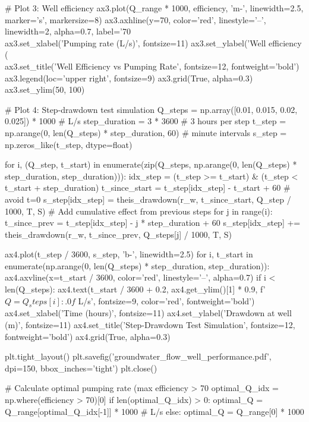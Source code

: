 \documentclass[a4paper, 11pt]{article}
\begin{document}
\begin{pycode}
# Plot 3: Well efficiency
ax3.plot(Q_range * 1000, efficiency, 'm-', linewidth=2.5, marker='s', markersize=8)
ax3.axhline(y=70, color='red', linestyle='--', linewidth=2, alpha=0.7, label='70\\%
ax3.set_xlabel('Pumping rate (L/s)', fontsize=11)
ax3.set_ylabel('Well efficiency (\\%
ax3.set_title('Well Efficiency vs Pumping Rate', fontsize=12, fontweight='bold')
ax3.legend(loc='upper right', fontsize=9)
ax3.grid(True, alpha=0.3)
ax3.set_ylim(50, 100)

# Plot 4: Step-drawdown test simulation
Q_steps = np.array([0.01, 0.015, 0.02, 0.025]) * 1000  # L/s
step_duration = 3 * 3600  # 3 hours per step
t_step = np.arange(0, len(Q_steps) * step_duration, 60)  # minute intervals
s_step = np.zeros_like(t_step, dtype=float)

for i, (Q_step, t_start) in enumerate(zip(Q_steps, np.arange(0, len(Q_steps) * step_duration, step_duration))):
    idx_step = (t_step >= t_start) & (t_step < t_start + step_duration)
    t_since_start = t_step[idx_step] - t_start + 60  # avoid t=0
    s_step[idx_step] = theis_drawdown(r_w, t_since_start, Q_step / 1000, T, S)
    # Add cumulative effect from previous steps
    for j in range(i):
        t_since_prev = t_step[idx_step] - j * step_duration + 60
        s_step[idx_step] += theis_drawdown(r_w, t_since_prev, Q_steps[j] / 1000, T, S)

ax4.plot(t_step / 3600, s_step, 'b-', linewidth=2.5)
for i, t_start in enumerate(np.arange(0, len(Q_steps) * step_duration, step_duration)):
    ax4.axvline(x=t_start / 3600, color='red', linestyle='--', alpha=0.7)
    if i < len(Q_steps):
        ax4.text(t_start / 3600 + 0.2, ax4.get_ylim()[1] * 0.9, f'$Q={Q_steps[i]:.0f}$ L/s',
                fontsize=9, color='red', fontweight='bold')
ax4.set_xlabel('Time (hours)', fontsize=11)
ax4.set_ylabel('Drawdown at well (m)', fontsize=11)
ax4.set_title('Step-Drawdown Test Simulation', fontsize=12, fontweight='bold')
ax4.grid(True, alpha=0.3)

plt.tight_layout()
plt.savefig('groundwater_flow_well_performance.pdf', dpi=150, bbox_inches='tight')
plt.close()

# Calculate optimal pumping rate (max efficiency > 70%
optimal_Q_idx = np.where(efficiency > 70)[0]
if len(optimal_Q_idx) > 0:
    optimal_Q = Q_range[optimal_Q_idx[-1]] * 1000  # L/s
else:
    optimal_Q = Q_range[0] * 1000
\end{pycode}
\end{document}
